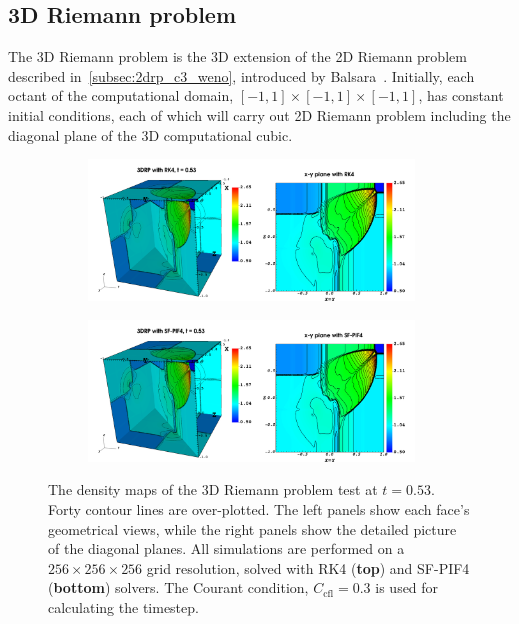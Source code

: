 \subsection{3D Riemann problem}\label{subsec:3drp}

The 3D Riemann problem is the 3D extension of the 2D Riemann problem described in~\cref{subsec:2drp_c3_weno},
introduced by Balsara~\cite{balsara2015three}.
Initially, each octant of the computational domain,
\( [-1, 1] \times [-1, 1] \times [-1, 1]\),
has constant initial conditions,
each of which will carry out 2D Riemann problem
including the diagonal plane of the 3D computational cubic.

\begin{figure}
    \centering
    \begin{subfigure}{140mm}
        \centering
        \includegraphics[width=0.95\textwidth]{fig/3drp_all_rk4.png}
    \end{subfigure}
    \begin{subfigure}{140mm}
        \centering
        \includegraphics[width=0.95\textwidth]{fig/3drp_all_sf4.png}
    \end{subfigure}
    \caption{The density maps of the 3D Riemann problem test at \( t = 0.53 \).
        Forty contour lines are over-plotted.
        The left panels show each face's geometrical views, while 
        the right panels show
        the detailed picture of the diagonal planes.
        All simulations are performed on a \( 256 \times 256 \times 256 \) grid resolution,
        solved with RK4 (\textbf{top}) and SF-PIF4 (\textbf{bottom}) solvers.
        The Courant condition, \( C_{\text{cfl}} = 0.3 \) is used for
        calculating the timestep.
    }\label{fig:3drp}
\end{figure}

